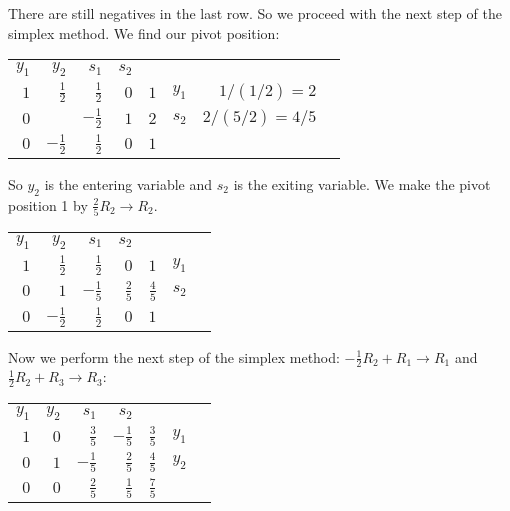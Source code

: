 \documentclass[11pt,letterpaper]{article}
\begin{document}
There are still negatives in the last row. So we proceed with the next step of the simplex method. We find our pivot position: 

	\begin{table}[!ht]
	\centering
	\begin{tabular}{rrrrrrr r}
	{\small $y_1$} & {\small $y_2$} & {\small $s_1$} & {\small $s_2$} \\
	$1$ & $\frac{1}{2}$ & $\frac{1}{2}$ & \multicolumn{1}{r|}{$0$} & $1$ & {\small $y_1$} & {\small $1/(1/2)= 2$} \\
	$0$ &  \fbox{$\frac{5}{2}$} & $-\frac{1}{2}$ & \multicolumn{1}{r|}{$1$} & $2$ & {\small $s_2$} & {\small $2/(5/2)= 4/5$} \\ \cline{1-5}
	$0$ & \underline{$-\frac{1}{2}$} & $\frac{1}{2}$ & \multicolumn{1}{r|}{$0$} & $1$
	\end{tabular}
	\end{table}

So $y_2$ is the entering variable and $s_2$ is the exiting variable. We make the pivot position 1 by $\frac{2}{5}R_2 \to R_2$.

	\begin{table}[!ht]
	\centering
	\begin{tabular}{rrrrrrr}
	{\small $y_1$} & {\small $y_2$} & {\small $s_1$} & {\small $s_2$} \\
	$1$ & $\frac{1}{2}$ & $\frac{1}{2}$ & \multicolumn{1}{r|}{$0$} & $1$ & {\small $y_1$} \\
	$0$ & $1$ & $-\frac{1}{5}$ & \multicolumn{1}{r|}{$\frac{2}{5}$} & $\frac{4}{5}$ & {\small $s_2$} \\ \cline{1-5}
	$0$ & $-\frac{1}{2}$ & $\frac{1}{2}$ & \multicolumn{1}{r|}{$0$} & $1$ 
	\end{tabular}
	\end{table}

 Now we perform the next step of the simplex method: $-\frac{1}{2}R_2 + R_1 \to R_1$ and $\frac{1}{2}R_2 + R_3 \to R_3$:
	\begin{table}[!ht]
	\centering
	\begin{tabular}{rrrrrrr}
	{\small $y_1$} & {\small $y_2$} & {\small $s_1$} & {\small $s_2$} \\
	$1$ & $0$ & $\frac{3}{5}$ & \multicolumn{1}{r|}{$-\frac{1}{5}$} & $\frac{3}{5}$ & {\small $y_1$} \\
	$0$ & $1$ & $-\frac{1}{5}$ & \multicolumn{1}{r|}{$\frac{2}{5}$} & $\frac{4}{5}$ & {\small $y_2$} \\ \cline{1-5}
	$0$ & $0$ & $\frac{2}{5}$ & \multicolumn{1}{r|}{$\frac{1}{5}$} & $\frac{7}{5}$ 
	\end{tabular}
	\end{table}
\end{document}
